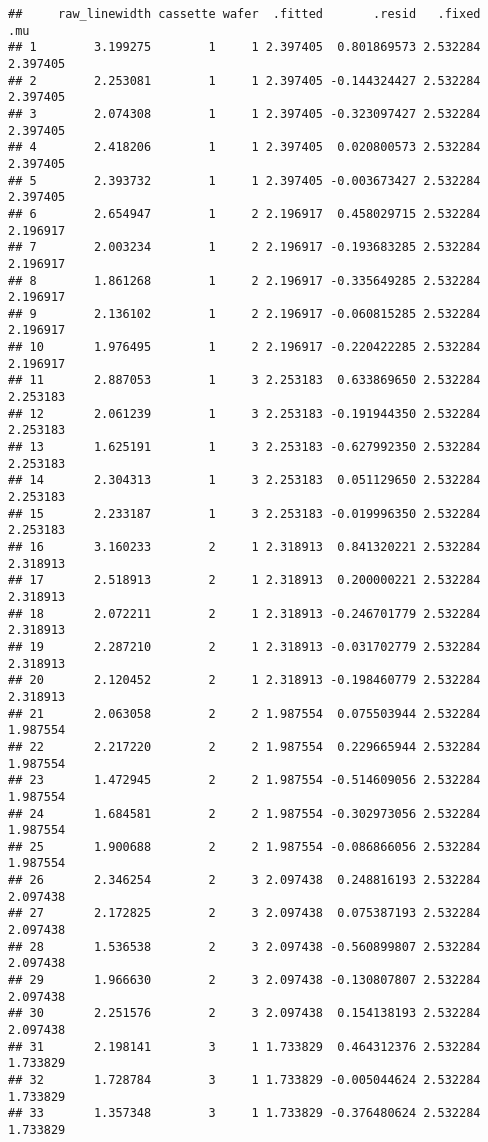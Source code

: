 \documentclass[]{book}
\theoremstyle{definition}
\theoremstyle{definition}
\theoremstyle{definition}
\theoremstyle{remark}
\begin{document}
\begin{verbatim}
##     raw_linewidth cassette wafer  .fitted       .resid   .fixed      .mu
## 1        3.199275        1     1 2.397405  0.801869573 2.532284 2.397405
## 2        2.253081        1     1 2.397405 -0.144324427 2.532284 2.397405
## 3        2.074308        1     1 2.397405 -0.323097427 2.532284 2.397405
## 4        2.418206        1     1 2.397405  0.020800573 2.532284 2.397405
## 5        2.393732        1     1 2.397405 -0.003673427 2.532284 2.397405
## 6        2.654947        1     2 2.196917  0.458029715 2.532284 2.196917
## 7        2.003234        1     2 2.196917 -0.193683285 2.532284 2.196917
## 8        1.861268        1     2 2.196917 -0.335649285 2.532284 2.196917
## 9        2.136102        1     2 2.196917 -0.060815285 2.532284 2.196917
## 10       1.976495        1     2 2.196917 -0.220422285 2.532284 2.196917
## 11       2.887053        1     3 2.253183  0.633869650 2.532284 2.253183
## 12       2.061239        1     3 2.253183 -0.191944350 2.532284 2.253183
## 13       1.625191        1     3 2.253183 -0.627992350 2.532284 2.253183
## 14       2.304313        1     3 2.253183  0.051129650 2.532284 2.253183
## 15       2.233187        1     3 2.253183 -0.019996350 2.532284 2.253183
## 16       3.160233        2     1 2.318913  0.841320221 2.532284 2.318913
## 17       2.518913        2     1 2.318913  0.200000221 2.532284 2.318913
## 18       2.072211        2     1 2.318913 -0.246701779 2.532284 2.318913
## 19       2.287210        2     1 2.318913 -0.031702779 2.532284 2.318913
## 20       2.120452        2     1 2.318913 -0.198460779 2.532284 2.318913
## 21       2.063058        2     2 1.987554  0.075503944 2.532284 1.987554
## 22       2.217220        2     2 1.987554  0.229665944 2.532284 1.987554
## 23       1.472945        2     2 1.987554 -0.514609056 2.532284 1.987554
## 24       1.684581        2     2 1.987554 -0.302973056 2.532284 1.987554
## 25       1.900688        2     2 1.987554 -0.086866056 2.532284 1.987554
## 26       2.346254        2     3 2.097438  0.248816193 2.532284 2.097438
## 27       2.172825        2     3 2.097438  0.075387193 2.532284 2.097438
## 28       1.536538        2     3 2.097438 -0.560899807 2.532284 2.097438
## 29       1.966630        2     3 2.097438 -0.130807807 2.532284 2.097438
## 30       2.251576        2     3 2.097438  0.154138193 2.532284 2.097438
## 31       2.198141        3     1 1.733829  0.464312376 2.532284 1.733829
## 32       1.728784        3     1 1.733829 -0.005044624 2.532284 1.733829
## 33       1.357348        3     1 1.733829 -0.376480624 2.532284 1.733829

\end{verbatim}
\end{document}
